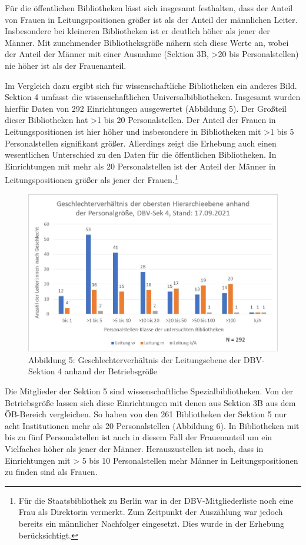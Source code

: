 \documentclass[a4paper,
fontsize=11pt,
oneside,
numbers=noperiodatend,
parskip=half-,
bibliography=totoc,
final
]{scrartcl}
\begin{document}
Für die öffentlichen Bibliotheken lässt sich insgesamt festhalten, dass
der Anteil von Frauen in Leitungspositionen größer ist als der Anteil
der männlichen Leiter. Insbesondere bei kleineren Bibliotheken ist er
deutlich höher als jener der Männer. Mit zunehmender Bibliotheksgröße
nähern sich diese Werte an, wobei der Anteil der Männer mit einer
Ausnahme (Sektion 3B, \textgreater20 bis Personalstellen) nie höher ist
als der Frauenanteil.

Im Vergleich dazu ergibt sich für wissenschaftliche Bibliotheken ein
anderes Bild. Sektion 4 umfasst die wissenschaftlichen
Universalbibliotheken. Insgesamt wurden hierfür Daten von 292
Einrichtungen ausgewertet (Abbildung 5). Der Großteil dieser
Bibliotheken hat \textgreater1 bis 20 Personalstellen. Der Anteil der
Frauen in Leitungspositionen ist hier höher und insbesondere in
Bibliotheken mit \textgreater1 bis 5 Personalstellen signifikant größer.
Allerdings zeigt die Erhebung auch einen wesentlichen Unterschied zu den
Daten für die öffentlichen Bibliotheken. In Einrichtungen mit mehr als
20 Personalstellen ist der Anteil der Männer in Leitungspositionen
größer als jener der Frauen.\footnote{Für die Staatsbibliothek zu Berlin
  war in der DBV-Mitgliederliste noch eine Frau als Direktorin vermerkt.
  Zum Zeitpunkt der Auszählung war jedoch bereits ein männlicher
  Nachfolger eingesetzt. Dies wurde in der Erhebung berücksichtigt.}

\begin{figure}
\centering
\includegraphics{img/Abb_05_DBV-Sek4.jpg}
\caption{Abbildung 5: Geschlechterverhältnis der Leitungsebene der
DBV-Sektion 4 anhand der Betriebsgröße}
\end{figure}

Die Mitglieder der Sektion 5 sind wissenschaftliche Spezialbibliotheken.
Von der Betriebsgröße lassen sich diese Einrichtungen mit denen aus
Sektion 3B aus dem ÖB-Bereich vergleichen. So haben von den 261
Bibliotheken der Sektion 5 nur acht Institutionen mehr als 20
Personalstellen (Abbildung 6). In Bibliotheken mit bis zu fünf
Personalstellen ist auch in diesem Fall der Frauenanteil um ein
Vielfaches höher als jener der Männer. Herauszustellen ist noch, dass in
Einrichtungen mit \textgreater{} 5 bis 10 Personalstellen mehr Männer in
Leitungspositionen zu finden sind als Frauen.
\end{document}
